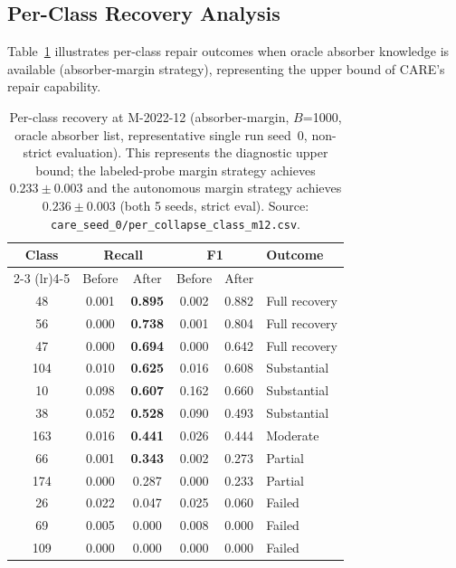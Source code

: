 \documentclass[journal]{IEEEtran}
\newcommand{\ours}{CARE}  %
\begin{document}
\subsection{Per-Class Recovery Analysis}

Table~\ref{tab:per_class} illustrates per-class repair outcomes when oracle absorber knowledge is available (absorber-margin strategy), representing the upper bound of \ours{}'s repair capability.

\begin{table}[t]
\centering
\caption{Per-class recovery at M-2022-12 (absorber-margin, $B$=1000, oracle absorber list, representative single run seed~0, non-strict evaluation). This represents the diagnostic upper bound; the labeled-probe margin strategy achieves $0.233{\pm}0.003$ and the autonomous margin strategy achieves $0.236{\pm}0.003$ (both 5 seeds, strict eval). Source: \texttt{care\_seed\_0/per\_collapse\_class\_m12.csv}.}
\label{tab:per_class}
\small
\begin{tabular}{@{}c cc cc l@{}}
\toprule
Class & \multicolumn{2}{c}{Recall} & \multicolumn{2}{c}{F1} & Outcome \\
\cmidrule(lr){2-3} \cmidrule(lr){4-5}
      & Before & After & Before & After & \\
\midrule
48  & 0.001 & \textbf{0.895} & 0.002 & 0.882 & Full recovery \\
56  & 0.000 & \textbf{0.738} & 0.001 & 0.804 & Full recovery \\
47  & 0.000 & \textbf{0.694} & 0.000 & 0.642 & Full recovery \\
104 & 0.010 & \textbf{0.625} & 0.016 & 0.608 & Substantial \\
10  & 0.098 & \textbf{0.607} & 0.162 & 0.660 & Substantial \\
38  & 0.052 & \textbf{0.528} & 0.090 & 0.493 & Substantial \\
163 & 0.016 & \textbf{0.441} & 0.026 & 0.444 & Moderate \\
66  & 0.001 & \textbf{0.343} & 0.002 & 0.273 & Partial \\
174 & 0.000 & 0.287 & 0.000 & 0.233 & Partial \\
\midrule
26  & 0.022 & 0.047 & 0.025 & 0.060 & Failed \\
69  & 0.005 & 0.000 & 0.008 & 0.000 & Failed \\
109 & 0.000 & 0.000 & 0.000 & 0.000 & Failed \\
\bottomrule
\end{tabular}
\end{table}
\end{document}
